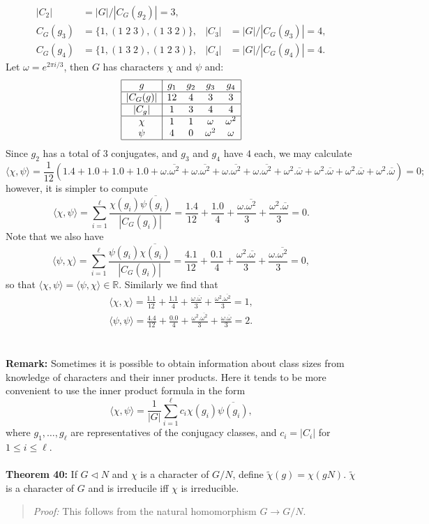{$$\begin{array}{rlrl}
|C_2|\!\!\!\!&=|G|/|C_G(g_2)|=3,\\
C_G(g_3)\!\!\!\!&=\{1,(1\;2\;3),(1\;3\;2)\},&|C_3|\!\!\!\!&=|G|/|C_G(g_3)|=4,\\
C_G(g_4)\!\!\!\!&=\{1,(1\;3\;2),(1\;2\;3)\},&|C_4|\!\!\!\!&=|G|/|C_G(g_4)|=4.
\end{array}
$$
Let $\omega=e^{2\pi i/3}$, then $G$ has characters $\chi$ and
$\psi$ and:
$$
\begin{array}{|c|cccc|}
\hline
g&g_1&g_2&g_3&g_4\\
\hline
|C_G(g)|&12&4&3&3\\
\hline
|C_g|&1&3&4&4\\
\hline
\chi&1&1&\omega&\omega^2\\
\psi&4&0&\omega^2&\omega\\
\hline
\end{array}
$$
Since $g_2$ has a total of $3$ conjugates, and $g_3$ and $g_4$ have
$4$ each, we may calculate
$$\langle\chi,\psi\rangle
=\frac{1}{12}(1.4+1.0+1.0+1.0+\omega.\overline{\omega^2}
+\omega.\overline{\omega^2}+\omega.\overline{\omega^2}
+\omega.\overline{\omega^2}+\omega^2.\overline{\omega}
+\omega^2.\overline{\omega}+\omega^2.\overline{\omega}
+\omega^2.\overline{\omega})=0;$$
however, it is simpler to compute
$$\langle\chi,\psi\rangle
=\sum_{i=1}^\ell\frac{\chi(g_i)\overline{\psi(g_i)}}{|C_G(g_i)|}
=\frac{1.4}{12}+\frac{1.0}{4}+\frac{\omega.\overline{\omega^2}}{3}
+\frac{\omega^2.\overline{\omega}}{3}=0.$$
Note that we also have
$$\langle\psi,\chi\rangle
=\sum_{i=1}^\ell\frac{\psi(g_i)\overline{\chi(g_i)}}{|C_G(g_i)|}
=\frac{4.1}{12}+\frac{0.1}{4}
+\frac{\omega^2.\overline{\omega}}{3}+\frac{\omega.\overline{\omega^2}}{3}=0,$$
so that $\langle\chi,\psi\rangle=\langle\psi,\chi\rangle\in{\mathbb R}$. Similarly we
find that
\begin{eqnarray*}
&\langle\chi,\chi\rangle
=\frac{1.1}{12}+\frac{1.1}{4}+\frac{\omega.\overline{\omega}}{3}
+\frac{\omega^2.\overline{\omega^2}}{3}=1,&\\
&\langle\psi,\psi\rangle
=\frac{4.4}{12}+\frac{0.0}{4}+\frac{\omega^2.\overline{\omega^2}}{3}
+\frac{\omega.\overline{\omega}}{3}=2.&
\end{eqnarray*}
\\
\\
{\bf Remark:} 
Sometimes it is possible to obtain information about
class sizes from knowledge of characters and their inner products. Here it
tends to be more convenient to use the inner product formula in the form
$$\langle\chi,\psi\rangle
=\frac{1}{|G|}\sum_{i=1}^\ell c_i\chi(g_i)\overline{\psi(g_i)},$$
where $g_1,\dots,g_\ell$ are representatives of the conjugacy classes, and
$c_i=|C_i|$ for $1\leq i\leq\ell$.
\\
\\
{\bf Theorem 40:}
If $G \lhd N$ and $\chi$ is a character of $G/N$,
define $\tilde{\chi}(g)= \chi(gN)$.  $\tilde{\chi}$ is a character of $G$ and is irreducile iff
$\chi$ is irreducible.
\begin{quote}
\emph{Proof:}  
This follows from the natural homomorphism $G \rightarrow G/N$.
\end{quote}
}
